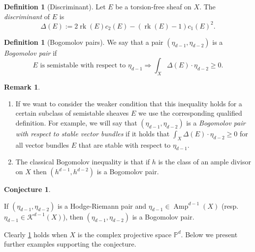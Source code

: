 \documentclass[a4,reqno]{amsart}
\theoremstyle{definition}
\newtheorem{definition}[theorem]{Definition}
\newtheorem{conjecture}[theorem]{Conjecture}
\newtheorem{remark}[theorem]{Remark}
\def\cK{\mathcal K}
\renewcommand{\P}{\mathbb{P}}
\DeclareMathOperator{\Amp}{Amp}
\DeclareMathOperator{\rk}{rk}
\numberwithin{equation}{section}
\begin{document}
\begin{definition}[Discriminant]
Let $E$ be a torsion-free sheaf on $X$.  The \emph{discriminant} of $E$ is
$$\Delta(E) := 2\rk(E) c_2(E)  - (\rk(E)-1) c_1(E)^2.$$
\end{definition}


\begin{definition}[Bogomolov pairs]\label{def:bogomolovpairsofclasses}
We say that a pair $(\eta_{d-1},\eta_{d-2})$ is a \emph{Bogomolov pair} if
$$ E \text{ is semistable with respect to } \eta_{d-1} \Rightarrow \int_X \Delta(E) \cdot \eta_{d-2}  \ge 0.$$
\end{definition}

\begin{remark}
\begin{enumerate}
\item  If we want to consider the weaker condition that this inequality holds for a certain subclass of semistable sheaves $E$ we use the corresponding qualified definition.  For example, we will say that $(\eta_{d-1},\eta_{d-2})$ is a \emph{Bogomolov pair with respect to stable vector bundles} if it holds that $\int_X \Delta(E)\cdot \eta_{d-2}\ge 0$ for all vector bundles $E$ that are stable with respect to $\eta_{d-1}$. 
\item The classical Bogomolov inequality \cite{Bogomolov_holomorphictensors,Gieseker_Bogomolov} is that if $h$ is the class of an ample divisor on $X$ then $(h^{d-1},h^{d-2})$ is a Bogomolov pair.
\end{enumerate}
\end{remark}

\begin{conjecture}\label{conj:HRimpliesBG}

 If $(\eta_{d-1},\eta_{d-2})$ is a Hodge-Riemann pair and $\eta_{d-1}\in \Amp^{d-1}(X)$ (resp. $\eta_{d-1}\in \cK^{d-1}(X)$), then $(\eta_{d-1},\eta_{d-2})$ is a Bogomolov pair.
\end{conjecture}

Clearly \cref{conj:HRimpliesBG} holds when $X$ is the complex projective space $\P^d$. Below we present further examples supporting the conjecture.
\end{document}

